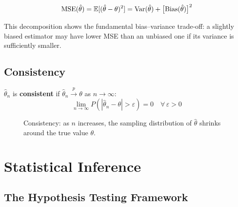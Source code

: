 \begin{tcolorbox}[keyresult]
\begin{equation}
  \operatorname{MSE}(\hat{\theta}) = \mathbb{E}[(\hat{\theta} - \theta)^2]
  = \operatorname{Var}(\hat{\theta}) + \bigl[\text{Bias}(\hat{\theta})\bigr]^2
\end{equation}
\end{tcolorbox}

This decomposition shows the fundamental bias--variance trade-off: a slightly
biased estimator may have lower MSE than an unbiased one if its variance is
sufficiently smaller.

\subsection{Consistency}

$\hat{\theta}_n$ is \textbf{consistent} if $\hat{\theta}_n
\xrightarrow{p} \theta$ as $n \to \infty$:
\begin{equation}
  \lim_{n \to \infty} P(|\hat{\theta}_n - \theta| > \varepsilon) = 0
  \quad \forall\,\varepsilon > 0
\end{equation}

\begin{figure}[htp]
\centering
{}
\caption{Consistency: as $n$ increases, the sampling distribution of
$\hat\theta$ shrinks around the true value $\theta$.}
\label{fig_Consistency}
\end{figure}


\section{Statistical Inference}
\label{sec_Inference}

\subsection{The Hypothesis Testing Framework}

